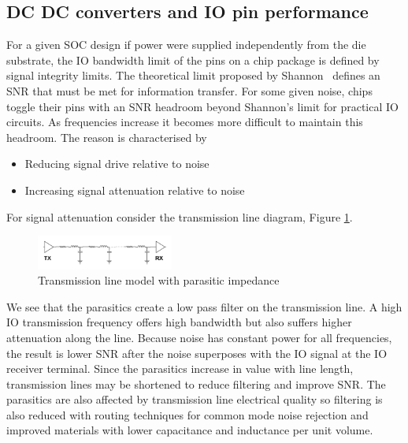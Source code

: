 \documentclass[letterpaper,twocolumn,10pt]{article}
\begin{document}
\subsection{DC DC converters and IO pin performance}

For a given SOC design if power were supplied independently from the die substrate, the IO bandwidth limit of the pins on a chip package is defined by signal integrity limits. The theoretical limit proposed by Shannon~\cite{Shannon1948} defines an SNR that must be met for information transfer. For some given noise, chips toggle their pins with an SNR headroom beyond Shannon's limit for practical IO circuits. As frequencies increase it becomes more difficult to maintain this headroom. The reason is characterised by 
\begin{itemize}
\item Reducing signal drive relative to noise
\item Increasing signal attenuation relative to noise
\end{itemize}


For signal attenuation consider the transmission line diagram, Figure \ref{TXLine}.\\
\begin{figure}[here]
\includegraphics[width=0.4\textwidth]{TransmissionLine}
\caption{Transmission line model with parasitic impedance}
\label{TXLine}
\end{figure}
We see that the parasitics create a low pass filter on the transmission line. A high IO transmission frequency offers high bandwidth but also suffers higher attenuation along the line. Because noise has constant power for all frequencies, the result is lower SNR after the noise superposes with the IO signal at the IO receiver terminal. Since the parasitics increase in value with line length, transmission lines may be shortened to reduce filtering and improve SNR. The parasitics are also affected by transmission line electrical quality so filtering is also reduced with routing techniques for common mode noise rejection and improved materials with lower capacitance and inductance per unit volume.
\end{document}
